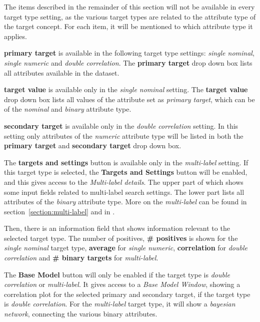 \documentclass{article}
\begin{document}
The items described in the remainder of this section will not be available in every target type setting, as the various target types are related to the attribute type of the target concept.
For each item, it will be mentioned to which attribute type it applies.

\textbf{primary target} is available in the following target type settings: \emph{single nominal}, \emph{single numeric} and \emph{double correlation}.
The {\bf primary target} drop down box lists all attributes available in the dataset.

\textbf{target value} is available only in the \emph{single nominal} setting.
The {\bf target value} drop down box lists all values of the attribute set as \emph{primary target}, which can be of the \emph{nominal} and \emph{binary} attribute type.

\textbf{secondary target} is available only in the \emph{double correlation} setting.
In this setting only attributes of the \emph{numeric} attribute type will be listed in both the \textbf{primary target} and {\bf secondary target} drop down box.

The \textbf{targets and settings} button is available only in the \emph{multi-label} setting.
If this target type is selected, the {\bf Targets and Settings} button will be enabled, and this gives access to the \emph{Multi-label details}.
The upper part of which shows some input fields related to multi-label search settings.
The lower part lists all attributes of the \emph{binary} attribute type.
More on the \emph{multi-label} can be found in section~\ref{section:multi-label} and in \cite{emm,sdmbn}.

Then, there is an information field that shows information relevant to the selected target type.
The number of positives, \textbf{\# positives} is shown for the \emph{single nominal} target type, \textbf{average} for \emph{single numeric}, \textbf{correlation} for \emph{double correlation} and \textbf{\# binary targets} for \emph{multi-label}.

The \textbf{Base Model} button will only be enabled if the target type is \emph{double correlation} or \emph{multi-label}.
It gives access to a \emph{Base Model Window}, showing a correlation plot for the selected primary and secondary target, if the target type is \emph{double correlation}.
For the \emph{multi-label} target type, it will show a \emph{bayesian network}, connecting the various binary attributes.
\end{document}

